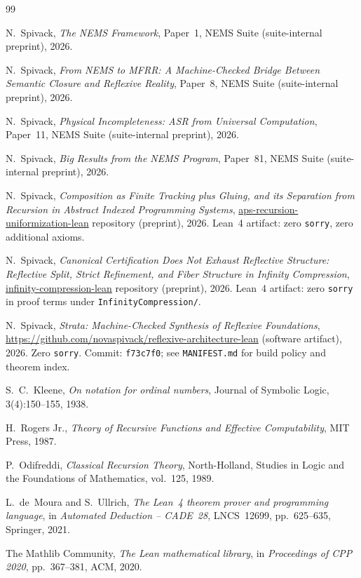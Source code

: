 \documentclass[11pt]{article}
\begin{document}
\begin{thebibliography}{99}
\raggedright

  N.~Spivack, \emph{The NEMS Framework},
  Paper~1, NEMS Suite (suite-internal preprint), 2026.

  N.~Spivack, \emph{From NEMS to MFRR: A Machine-Checked Bridge Between Semantic
  Closure and Reflexive Reality},
  Paper~8, NEMS Suite (suite-internal preprint), 2026.

  N.~Spivack, \emph{Physical Incompleteness: ASR from Universal Computation},
  Paper~11, NEMS Suite (suite-internal preprint), 2026.

  N.~Spivack, \emph{Big Results from the NEMS Program},
  Paper~81, NEMS Suite (suite-internal preprint), 2026.

  N.~Spivack, \emph{Composition as Finite Tracking plus Gluing,
  and its Separation from Recursion in Abstract Indexed Programming Systems},
  \url{aps-recursion-uniformization-lean} repository (preprint), 2026.
  Lean~4 artifact: zero \texttt{sorry}, zero additional axioms.

  N.~Spivack, \emph{Canonical Certification Does Not Exhaust Reflective Structure:
  Reflective Split, Strict Refinement, and Fiber Structure in Infinity Compression},
  \url{infinity-compression-lean} repository (preprint), 2026.
  Lean~4 artifact: zero \texttt{sorry} in proof terms under \texttt{InfinityCompression/}.

  N.~Spivack, \emph{Strata: Machine-Checked Synthesis of Reflexive Foundations},
  \url{https://github.com/novaspivack/reflexive-architecture-lean} (software artifact),
  2026.  Zero \texttt{sorry}.  Commit: \texttt{f73c7f0}; see \texttt{MANIFEST.md} for
  build policy and theorem index.

  S.~C.~Kleene, \emph{On notation for ordinal numbers},
  Journal of Symbolic Logic, 3(4):150--155, 1938.

  H.~Rogers Jr., \emph{Theory of Recursive Functions and Effective Computability},
  MIT Press, 1987.

  P.~Odifreddi, \emph{Classical Recursion Theory},
  North-Holland, Studies in Logic and the Foundations of Mathematics,
  vol.~125, 1989.

  L.~de~Moura and S.~Ullrich,
  \emph{The Lean~4 theorem prover and programming language},
  in \emph{Automated Deduction -- CADE~28}, LNCS~12699,
  pp.~625--635, Springer, 2021.

  The Mathlib Community,
  \emph{The Lean mathematical library},
  in \emph{Proceedings of CPP 2020}, pp.~367--381, ACM, 2020.

\end{thebibliography}
\end{document}
